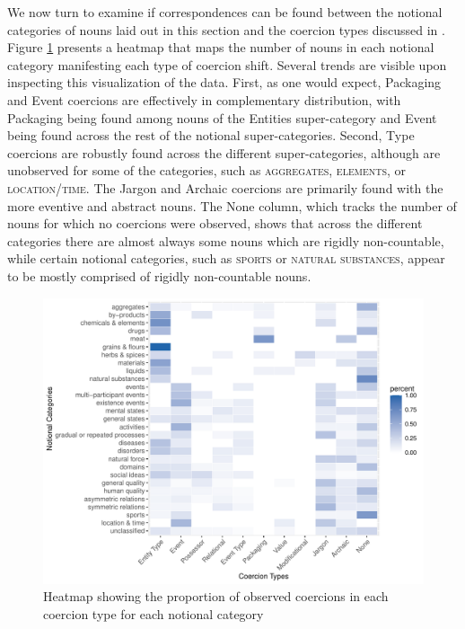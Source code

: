 \documentclass[output=paper]{langscibook}
\begin{document}
We now turn to examine if correspondences can be found between the notional categories of nouns laid out in this section and the coercion types discussed in .  Figure \ref{gri-ric:fig:heatmap} presents a heatmap that maps the number of nouns in each notional category manifesting each type of coercion shift.  Several trends are visible upon inspecting this visualization of the data.  First, as one would expect, Packaging and Event coercions are effectively in complementary distribution, with Packaging being found among nouns of the Entities super-category and Event being found across the rest of the notional super-categories.  Second, Type coercions are robustly found across the different super-categories, although are unobserved for some of the categories, such as \textsc{aggregates}, \textsc{elements}, or \textsc{location/time}.   The Jargon and Archaic coercions are primarily found with the more eventive and abstract nouns.  The None column, which tracks the number of nouns for which no coercions were observed, shows that across the different categories there are almost always some nouns which are rigidly non-countable, while certain notional categories, such as \textsc{sports} or \textsc{natural substances}, appear to be mostly comprised of rigidly non-countable nouns.



\begin{figure}
\includegraphics[width=\linewidth]{figures/Rplot03.pdf}
\caption{Heatmap showing the proportion of observed coercions in each coercion type for each  notional category}
    \label{gri-ric:fig:heatmap}
\end{figure}
\end{document}
